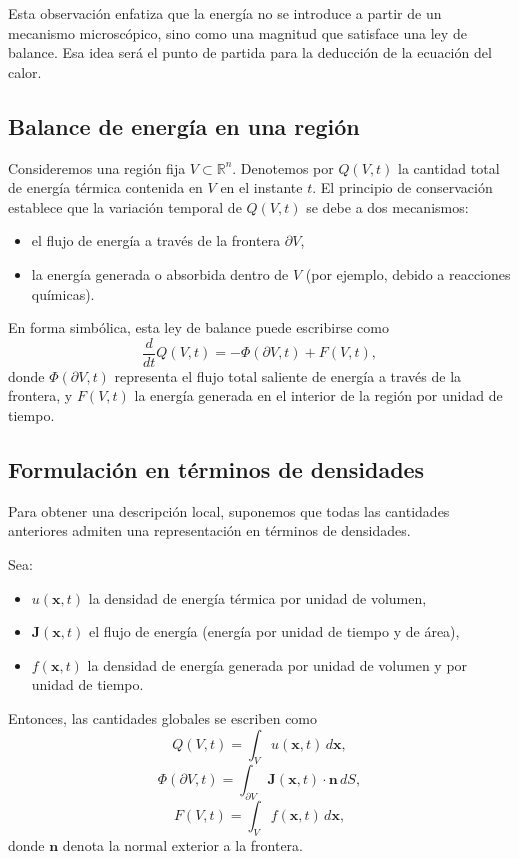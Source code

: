 \documentclass[12pt, a4paper]{amsbook}
\newcommand{\n}{{\mathbf n}}
\newcommand{\xx}{{\mathbf x}}
\theoremstyle{remark}
\theoremstyle{definition}
\numberwithin{section}{chapter}
\numberwithin{subsection}{section}
\numberwithin{equation}{section}
\numberwithin{figure}{chapter}
\begin{document}
Esta observación enfatiza que la energía no se introduce a partir de un mecanismo microscópico, sino como una magnitud que satisface una ley de balance. Esa idea será el punto de partida para la deducción de la ecuación del calor.

\subsection{Balance de energía en una región}

Consideremos una región fija $V \subset \mathbb{R}^n$. Denotemos por $Q(V,t)$ la cantidad total de energía térmica contenida en $V$ en el instante $t$. El principio de conservación establece que la variación temporal de $Q(V,t)$ se debe a dos mecanismos:

\begin{itemize}
    \item el flujo de energía a través de la frontera $\partial V$,
    \item la energía generada o absorbida dentro de $V$ (por ejemplo, debido a reacciones químicas).
\end{itemize}

En forma simbólica, esta ley de balance puede escribirse como
$$
\frac{d}{dt} Q(V,t) = -\Phi(\partial V,t) + F(V,t),
$$
donde $\Phi(\partial V,t)$ representa el flujo total saliente de energía a través de la frontera, y $F(V,t)$ la energía generada en el interior de la región por unidad de tiempo.

\subsection{Formulación en términos de densidades}

Para obtener una descripción local, suponemos que todas las cantidades anteriores admiten una representación en términos de densidades.

Sea:
\begin{itemize}
    \item $u(\xx, t)$ la densidad de energía térmica por unidad de volumen,
    \item $\mathbf{J}(\xx, t)$ el flujo de energía (energía por unidad de tiempo y de área),
    \item $f(\xx, t)$ la densidad de energía generada por unidad de volumen y por unidad de tiempo.
\end{itemize}

Entonces, las cantidades globales se escriben como
$$
Q(V,t) = \int_V u(\xx,t)\, d\xx,
$$
$$
\Phi(\partial V,t) = \int_{\partial V} \mathbf{J}(\xx,t)\cdot \n\, dS,
$$
$$
F(V,t) = \int_V f(\xx,t)\, d\xx,
$$
donde $\n$ denota la normal exterior a la frontera.
\end{document}
